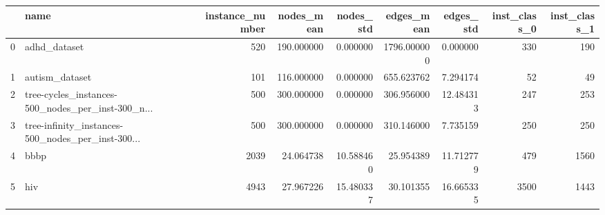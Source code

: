 \begin{tabular}{llrrrrrrr}
\toprule
{} &                                               name &  instance\_number &  nodes\_mean &  nodes\_std &   edges\_mean &  edges\_std &  inst\_class\_0 &  inst\_class\_1 \\
\midrule
0 &                                       adhd\_dataset &              520 &  190.000000 &   0.000000 &  1796.000000 &   0.000000 &           330 &           190 \\
1 &                                     autism\_dataset &              101 &  116.000000 &   0.000000 &   655.623762 &   7.294174 &            52 &            49 \\
2 &  tree-cycles\_instances-500\_nodes\_per\_inst-300\_n... &              500 &  300.000000 &   0.000000 &   306.956000 &  12.484313 &           247 &           253 \\
3 &  tree-infinity\_instances-500\_nodes\_per\_inst-300... &              500 &  300.000000 &   0.000000 &   310.146000 &   7.735159 &           250 &           250 \\
4 &                                               bbbp &             2039 &   24.064738 &  10.588460 &    25.954389 &  11.712779 &           479 &          1560 \\
5 &                                                hiv &             4943 &   27.967226 &  15.480337 &    30.101355 &  16.665335 &          3500 &          1443 \\
\bottomrule
\end{tabular}
